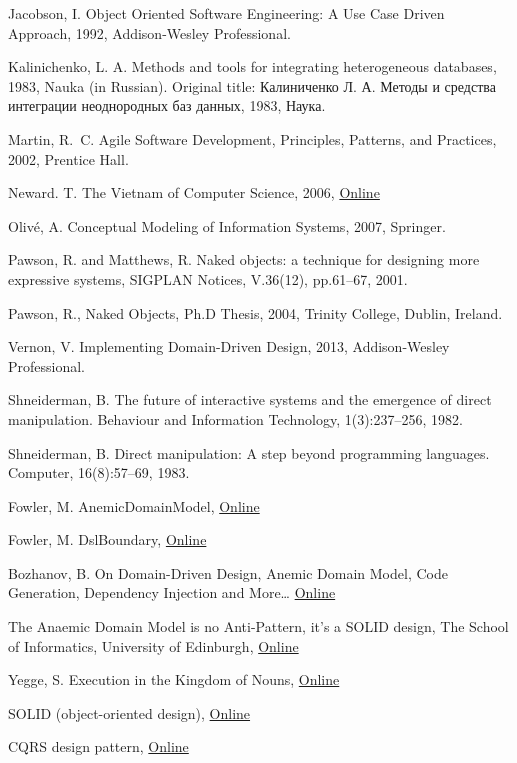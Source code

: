 \documentclass[a4paper,12pt,oneside,openright,final]{memoir} %
\begin{document}
\begin{thebibliography}{5}
Jacobson, I. Object Oriented Software Engineering: A Use Case Driven Approach, 1992, Addison-Wesley Professional.

Kalinichenko, L. A. Methods and tools for integrating heterogeneous databases, 1983, Nauka (in Russian).
\foreignlanguage{russian}{Original title: Калиниченко Л. А. Методы и средства интеграции неоднородных баз данных, 1983, Наука.}

Martin, R.~C. Agile Software Development, Principles, Patterns, and Practices, 2002, Prentice Hall.

New\-ard. T. The Vietnam of Computer Science, 2006,
\href{http://blogs.tedneward.com/2006/06/26/The+Vietnam+Of+Computer+Science.aspx}{Online}

Oliv\'{e}, A. Conceptual Modeling of Information Systems, 2007, Springer.

Pawson, R. and Matthews, R. Naked objects: a technique for designing more expressive systems, SIGPLAN Notices, V.36(12), pp.61--67, 2001.

Pawson, R., Naked Objects, Ph.D Thesis, 2004, Trinity College, Dublin, Ireland.

Vernon, V. Implementing Domain-Driven Design, 2013, Addison-Wesley Professional.

Shneiderman, B. The future of interactive systems and the emergence of direct manipulation. Behaviour and Information Technology, 1(3):237–256, 1982.

Shneiderman, B. Direct manipulation: A step beyond programming languages. Computer, 16(8):57–69, 1983.

 Fowler, M. AnemicDomainModel, 
\href{http://www.martinfowler.com/bliki/AnemicDomainModel.html}{Online}

 Fowler, M. DslBoundary, 
\href{http://martinfowler.com/bliki/DslBoundary.html}{Online}

 Bozhanov, B. On Domain-Driven Design, Anemic Domain Model, Code Generation, Dependency Injection and More…
\href{http://techblog.bozho.net/on-domain-driven-design-anemic-domain-models-code-generation-dependency-injection-and-more/}{Online}

  The Anaemic Domain Model is no Anti-Pattern, it’s a SOLID design, The School of Informatics, University of Edinburgh,
\href{https://blog.inf.ed.ac.uk/sapm/2014/02/04/the-anaemic-domain-model-is-no-anti-pattern-its-a-solid-design/}{Online}

 Yegge, S. Execution in the Kingdom of Nouns,  
\href{http://steve-yegge.blogspot.com.au/2006/03/execution-in-kingdom-of-nouns.html}{Online}

 SOLID (object-oriented design), 
\href{https://en.wikipedia.org/wiki/SOLID_(object-oriented_design)}{Online}

 CQRS design pattern, 
\href{https://cqrs.files.wordpress.com/2010/11/cqrs_documents.pdf}{Online}

\end{thebibliography}
%
\end{document}
